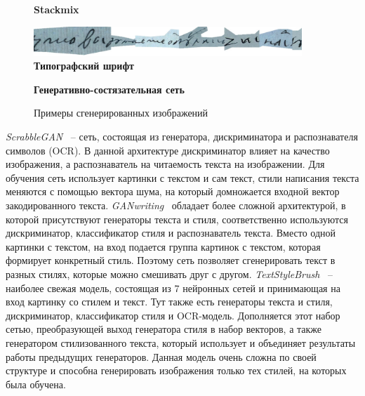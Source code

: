 \begin{figure}[h!]
    \centering
    \textbf{Stackmix}\par\medskip
    \includegraphics[width=0.9\textwidth]{img/aug_stackmix}
    \textbf{Типографский шрифт}\par\medskip
    \textbf{Генеративно-состязательная сеть}\par\medskip
    \caption{Примеры сгенерированных изображений}
    \label{fig:generation}
\end{figure}

\textit{ScrabbleGAN}~\cite{fogel2020scrabblegan} -- сеть, состоящая из генератора, дискриминатора и распознавателя символов (OCR).
В данной архитектуре дискриминатор влияет на качество изображения, а распознаватель на читаемость текста на изображении.
Для обучения сеть использует картинки с текстом и сам текст, стили написания текста меняются с помощью вектора шума,
на который домножается входной вектор закодированного текста.
\textit{GANwriting}~\cite{kang2020ganwriting} обладает более сложной архитектурой, в которой присутствуют генераторы текста и стиля,
соответственно используются дискриминатор, классификатор стиля и распознаватель текста.
Вместо одной картинки с текстом, на вход подается группа картинок с текстом, которая формирует конкретный стиль.
Поэтому сеть позволяет сгенерировать текст в разных стилях, которые можно смешивать друг с другом.
\textit{TextStyleBrush}~\cite{krishnan2023textstylebrush} -- наиболее свежая модель, состоящая из 7 нейронных сетей и принимающая на вход картинку со стилем и текст.
Тут также есть генераторы текста и стиля, дискриминатор, классификатор стиля и OCR-модель.
Дополняется этот набор сетью, преобразующей выход генератора стиля в набор векторов, а также генератором стилизованного текста,
который использует и объединяет результаты работы предыдущих генераторов.
Данная модель очень сложна по своей структуре и способна генерировать изображения только тех стилей, на которых была обучена.

